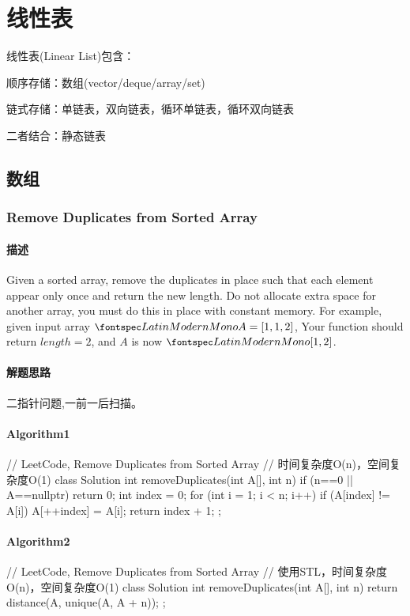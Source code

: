 \chapter{线性表}
线性表(Linear List)包含：
\begindot
\item 顺序存储：数组(vector/deque/array/set)
\item 链式存储：单链表，双向链表，循环单链表，循环双向链表
\item 二者结合：静态链表
\myenddot

\section{数组} %


\subsection{Remove Duplicates from Sorted Array}
\label{sec:remove-duplicates-from-sorted-array}


\subsubsection{描述}
Given a sorted array, remove the duplicates in place such that each element 
appear only once and return the new length.
Do not allocate extra space for another array, you must do this in place with 
constant memory.
For example, given input array $\code{A = [1,1,2]}$,
Your function should return $length = 2$, and $A$ is now $\code{[1,2]}$.

\subsubsection{解题思路}
二指针问题,一前一后扫描。

\subsubsection{Algorithm1}
\begin{Code}
	// LeetCode, Remove Duplicates from Sorted Array
	// 时间复杂度O(n)，空间复杂度O(1)
	class Solution {
		int removeDuplicates(int A[], int n) {
			if (n==0 || A==nullptr) return 0;
			int index = 0;
			for (int i = 1; i < n; i++) 
				if (A[index] != A[i]) A[++index] = A[i];
			return index + 1;
		}
	};
\end{Code}
\subsubsection{Algorithm2}
\begin{Code}
	// LeetCode, Remove Duplicates from Sorted Array
	// 使用STL，时间复杂度O(n)，空间复杂度O(1)
	class Solution {
		int removeDuplicates(int A[], int n) {
			return distance(A, unique(A, A + n));
		}
	};
\end{Code}
